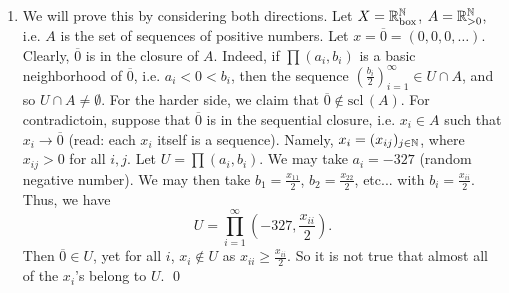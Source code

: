 \begin{enumerate}[label=(\alph*)]
    \item We will prove this by considering both directions. Let $X = \mathbb R^\mathbb N_\mathrm{box}$, $A = \mathbb R^\mathbb N_{>0}$, i.e. $A$ is the set of sequences of positive numbers. Let $x = \overline{0} = (0, 0, 0, \dots)$. Clearly, $\overline{0}$ is in the closure of $A$. Indeed, if $\prod (a_i, b_i)$ is a basic neighborhood of $\overline{0}$, i.e. $a_i < 0 < b_i$, then the sequence $\left(\frac{b_i}{2}\right)_{i=1}^\infty \in U \cap A$, and so $U \cap A \neq \emptyset$.
    \medskip\newline
    For the harder side, we claim that $\overline{0} \not\in \mathrm{scl}\,(A)$. For contradictoin, suppose that $\overline{0}$ is in the sequential closure, i.e. $x_i \in A$ such that $x_i \to \overline{0}$ (read: each $x_i$ itself is a sequence). Namely, $x_i = (x_{ij})_{j \in \mathbb N}$, where $x_{ij} > 0$ for all $i, j$. Let $U = \prod (a_i, b_i)$. We may take $a_i = -327$ (random negative number). We may then take $b_1 = \frac{x_{11}}{2}$, $b_2 = \frac{x_{22}}{2}$, etc... with $b_i = \frac{x_{ii}}{2}$. Thus, we have
    \[ U = \prod_{i=1}^\infty \left(-327, \frac{x_{ii}}{2}\right). \]
    Then $\overline{0} \in U$, yet for all $i$, $x_i \not\in U$ as $x_{ii} \geq \frac{x_{ii}}{2}$. So it is not true that almost all of the $x_i$'s belong to $U$. \qed


\end{enumerate}
